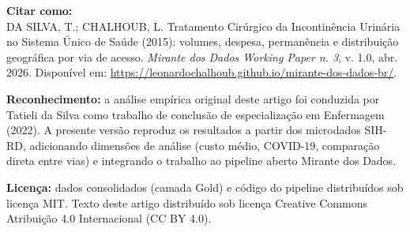 \documentclass[12pt,a4paper,oneside]{article}
\begin{document}
\vspace{1cm}

\noindent\textbf{Citar como:}\\
DA SILVA, T.; CHALHOUB, L. Tratamento Cirúrgico da Incontinência
Urinária no Sistema Único de Saúde (2015): volumes,
despesa, permanência e distribuição geográfica por via de acesso.
\textit{Mirante dos Dados \textemdash{} Working Paper n. 3}, v. 1.0,
abr. 2026. Disponível em:
\url{https://leonardochalhoub.github.io/mirante-dos-dados-br/}.

\vspace{0.5cm}

\noindent\textbf{Reconhecimento:} a análise empírica original deste
artigo foi conduzida por Tatieli da Silva como trabalho de conclusão
de especialização em Enfermagem (2022). A presente versão reproduz os
resultados a partir dos microdados SIH-RD, adicionando dimensões de
análise (custo médio, COVID-19, comparação direta entre vias) e
integrando o trabalho ao pipeline aberto Mirante dos Dados.

\vspace{0.5cm}

\noindent\textbf{Licença:} dados consolidados (camada Gold) e código
do pipeline distribuídos sob licença MIT. Texto deste artigo
distribuído sob licença Creative Commons Atribuição 4.0 Internacional
(CC BY 4.0).
\end{document}
